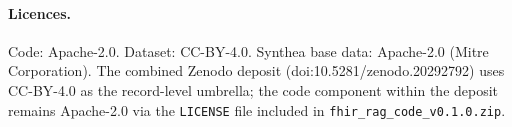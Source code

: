 \paragraph{Licences.}
Code: Apache-2.0.  Dataset: CC-BY-4.0.  Synthea base data: Apache-2.0
(Mitre Corporation).  The combined Zenodo deposit
(doi:10.5281/zenodo.20292792) uses CC-BY-4.0 as the record-level umbrella;
the code component within the deposit remains Apache-2.0 via the
\texttt{LICENSE} file included in \texttt{fhir\_rag\_code\_v0.1.0.zip}.
